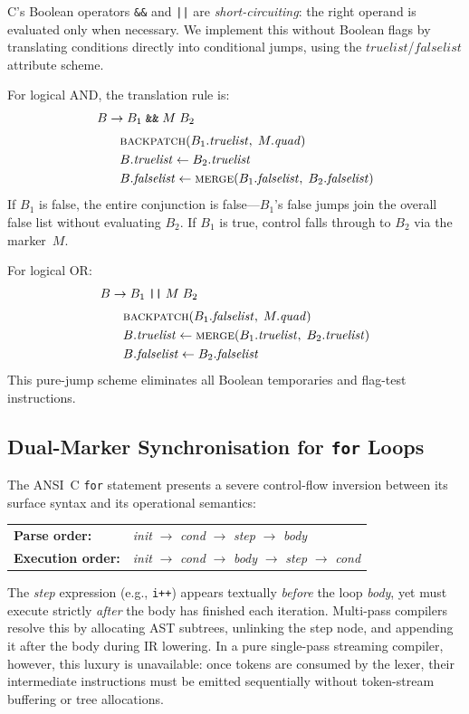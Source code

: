 \documentclass[conference]{IEEEtran}
\begin{document}
C's Boolean operators \texttt{\&\&} and \texttt{||} are \emph{short-circuiting}: the right operand is evaluated only when necessary. We implement this without Boolean flags by translating conditions directly into conditional jumps, using the $\mathit{truelist}$/$\mathit{falselist}$ attribute scheme.

For logical AND, the translation rule is:
\begin{align*}
B &\to B_1 \;\texttt{\&\&}\; M\; B_2 \\[3pt]
&\quad \textsc{backpatch}(B_1.\mathit{truelist},\; M.\mathit{quad}) \\
&\quad B.\mathit{truelist} \leftarrow B_2.\mathit{truelist} \\
&\quad B.\mathit{falselist} \leftarrow \textsc{merge}(B_1.\mathit{falselist},\; B_2.\mathit{falselist})
\end{align*}
If $B_1$ is false, the entire conjunction is false---$B_1$'s false jumps join the overall false list without evaluating $B_2$. If $B_1$ is true, control falls through to $B_2$ via the marker~$M$.

For logical OR:
\begin{align*}
B &\to B_1 \;\texttt{||}\; M\; B_2 \\[3pt]
&\quad \textsc{backpatch}(B_1.\mathit{falselist},\; M.\mathit{quad}) \\
&\quad B.\mathit{truelist} \leftarrow \textsc{merge}(B_1.\mathit{truelist},\; B_2.\mathit{truelist}) \\
&\quad B.\mathit{falselist} \leftarrow B_2.\mathit{falselist}
\end{align*}
This pure-jump scheme eliminates all Boolean temporaries and flag-test instructions.

\subsection{Dual-Marker Synchronisation for \texttt{for} Loops}
\label{sec:forloop}

The ANSI~C \texttt{for} statement presents a severe control-flow inversion between its surface syntax and its operational semantics:
\begin{center}
\footnotesize
\begin{tabular}{@{}ll@{}}
\textbf{Parse order:} & \textit{init} $\to$ \textit{cond} $\to$ \textit{step} $\to$ \textit{body}\\
\textbf{Execution order:} & \textit{init} $\to$ \textit{cond} $\to$ \textit{body} $\to$ \textit{step} $\to$ \textit{cond}
\end{tabular}
\end{center}
The \textit{step} expression (e.g., \texttt{i++}) appears textually \emph{before} the loop \textit{body}, yet must execute strictly \emph{after} the body has finished each iteration. Multi-pass compilers resolve this by allocating AST subtrees, unlinking the step node, and appending it after the body during IR lowering. In a pure single-pass streaming compiler, however, this luxury is unavailable: once tokens are consumed by the lexer, their intermediate instructions must be emitted sequentially without token-stream buffering or tree allocations.
\end{document}
